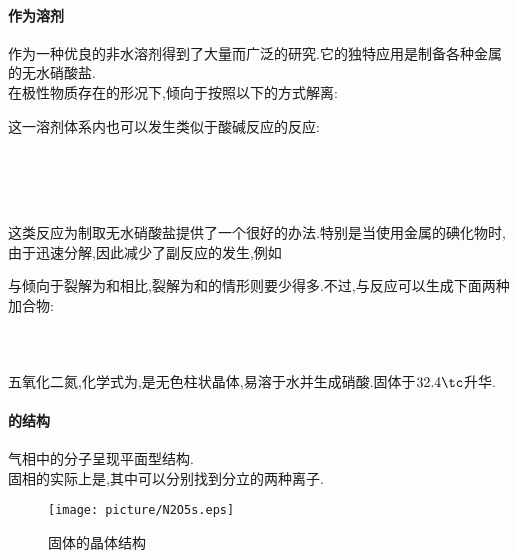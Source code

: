 \documentclass{ctexart}
\begin{document}
\paragraph{作为溶剂}
作为一种优良的非水溶剂得到了大量而广泛的研究.它的独特应用是制备各种金属的无水硝酸盐.\\
\indent 在极性物质存在的形况下,倾向于按照以下的方式解离:
\begin{center}
\end{center}
这一溶剂体系内也可以发生类似于酸碱反应的反应:
\begin{center}
    \\
    \\
    \\
\end{center}
这类反应为制取无水硝酸盐提供了一个很好的办法.特别是当使用金属的碘化物时,由于迅速分解,因此减少了副反应的发生,例如
\begin{center}
\end{center}
\indent 与倾向于裂解为和相比,裂解为和的情形则要少得多.不过,与反应可以生成下面两种加合物:
\begin{center}
    \\
\end{center}
\subsubsection{}
\begin{substance}[\ce{N2O5}]
    五氧化二氮,化学式为,是无色柱状晶体,易溶于水并生成硝酸.固体于$32.4\tc$升华.
\end{substance}
\paragraph{的结构}
气相中的分子呈现平面型结构.\\
\indent 固相的实际上是\ce{[NO2]+[NO3]-},其中可以分别找到分立的两种离子.
\begin{figure}[H]
    \centering\texttt{[image: picture/N2O5s.eps]}\caption{固体的晶体结构}
\end{figure}
\end{document}

